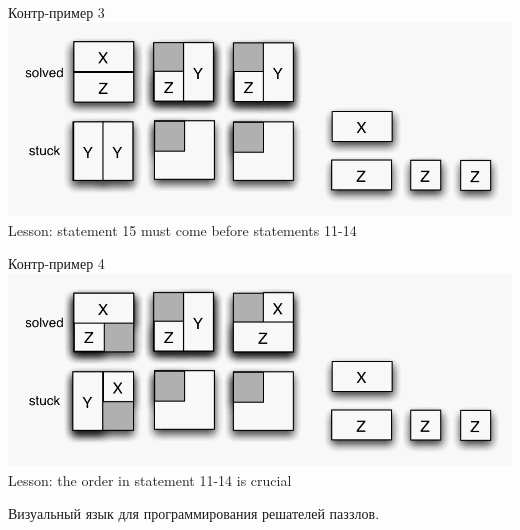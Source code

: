 \documentclass[aspectratio=169
  , xcolor={svgnames}
  , hyperref={ colorlinks,citecolor=DeepPink4
             , linkcolor=DarkRed,urlcolor=DarkBlue}
  , russian
  ]{beamer}
\theoremstyle{exerciseStyle1}
\begin{document}
\begin{frame}[fragile]{Контр-пример 3}
\includegraphics[width=0.9\paperwidth]{figures/ce3.png}
Lesson: statement 15 must come before statements 11-14
\end{frame}

\begin{frame}[fragile]{Контр-пример 4}
\includegraphics[width=0.9\paperwidth]{figures/ce4.png}
Lesson: the order in statement 11-14 is crucial
\end{frame}

\begin{frame}[fragile]
\begin{minipage}{.38\textwidth}
Визуальный язык для программирования решателей паззлов.
\end{minipage}
\end{frame}
\end{document}
